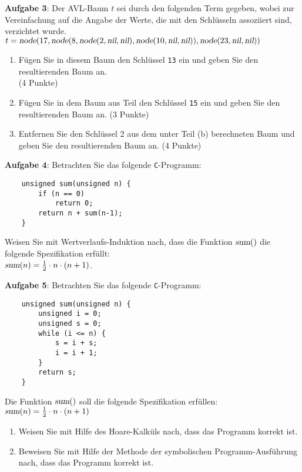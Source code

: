 \documentclass{article}
\begin{document}
\noindent
\textbf{Aufgabe 3}: Der AVL-Baum $t$ sei durch den folgenden Term gegeben,
wobei zur Vereinfachung auf die Angabe der Werte, die mit den Schl\"usseln
assoziiert sind, verzichtet wurde.
\\[0.2cm]
\hspace*{1.3cm}
$t = \textsl{node}(17, \textsl{node}(8, \textsl{node}(2, \textsl{nil}, \textsl{nil}),
 \textsl{node}(10, \textsl{nil}, \textsl{nil})), \textsl{node}(23,\textsl{nil},\textsl{nil}))$
\begin{enumerate}
\item F\"ugen Sie  in diesem Baum den Schl\"ussel \texttt{13} ein und geben Sie den
      resultierenden Baum an.   \\[0.2cm]
      \hspace*{\fill} (4 Punkte)
\item F\"ugen Sie in dem Baum aus Teil den Schl\"ussel \texttt{15} ein und geben Sie den
      resultierenden Baum an.
      \hspace*{\fill} (3 Punkte)
\item Entfernen Sie den Schl\"ussel 2 aus dem unter Teil (b) berechneten Baum und geben Sie
      den resultierenden Baum an.
      \hspace*{\fill} (4 Punkte)
\end{enumerate}

\noindent
\textbf{Aufgabe 4}:  Betrachten Sie das folgende \texttt{C}-Programm:
\begin{verbatim}
    unsigned sum(unsigned n) {
        if (n == 0)
            return 0;
        return n + sum(n-1);
    }
\end{verbatim}
Weisen Sie mit Wertverlaufs-Induktion nach, dass die Funktion $\textsl{sum}()$  die
folgende Spezifikation erf\"ullt:
\\[0.2cm]
\hspace*{1.3cm}
$\textsl{sum}(n) = \frac{1}{2} \cdot n \cdot (n + 1)$.
\vspace{0.3cm}
\pagebreak

\noindent
\textbf{Aufgabe 5}:  Betrachten Sie das folgende \texttt{C}-Programm:
\begin{verbatim}
    unsigned sum(unsigned n) {
        unsigned i = 0;
        unsigned s = 0;
        while (i <= n) {
            s = i + s;
            i = i + 1;
        }
        return s;
    }
\end{verbatim}
Die Funktion $\textsl{sum}()$  soll die folgende Spezifikation erf\"ullen:
\\[0.2cm]
\hspace*{1.3cm}
$\textsl{sum}(n) = \frac{1}{2} \cdot n \cdot (n + 1)$
\begin{enumerate}
\item Weisen Sie mit Hilfe des Hoare-Kalk\"uls nach, dass das Programm korrekt ist.
\item Beweisen Sie mit Hilfe der Methode der symbolischen Programm-Ausf\"uhrung nach,
      dass das Programm korrekt ist.
\end{enumerate}
\vspace{0.3cm}
\end{document}
